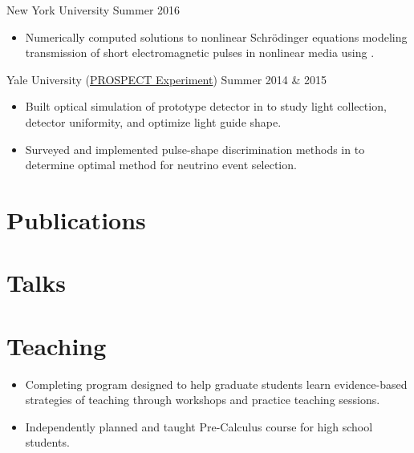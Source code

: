 \documentclass{cultvoucher}
\begin{document}
{New York University}
{Summer 2016}
\begin{itemize}
	\vspace{-0.25em}
	\item Numerically computed solutions to nonlinear Schr\"{o}dinger equations modeling transmission of short electromagnetic pulses in nonlinear media using .
\end{itemize}

{Yale University (\href{http://prospect.yale.edu/}{\small{PROSPECT Experiment}})}
{Summer 2014 \& 2015}
\begin{itemize}
	\vspace{-0.25em}
	\item Built optical simulation of prototype detector in  to study light collection, detector uniformity, and optimize light guide shape.
	\item Surveyed and implemented pulse-shape discrimination methods in  to determine optimal method for neutrino event selection.
\end{itemize}

\section{Publications}

\section{Talks}

\section{Teaching}

\begin{itemize}
	\vspace{-0.25em}
	\item Completing program designed to help graduate students learn evidence-based strategies of teaching through workshops and practice teaching sessions.
\end{itemize}

\begin{itemize}
	\vspace{-0.25em}
	\item Independently planned and taught Pre-Calculus course for high school students.
\end{itemize}
\end{document}
